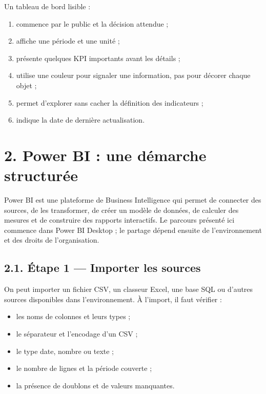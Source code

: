 \documentclass[
  french,
  letterpaper,
  open=any]{scrbook}
\providecommand{\tightlist}{%
  \setlength{\itemsep}{0pt}\setlength{\parskip}{0pt}}
\theoremstyle{definition}
\theoremstyle{definition}
\theoremstyle{remark}
\begin{document}
Un tableau de bord lisible :

\begin{enumerate}
\def\labelenumi{\arabic{enumi}.}
\tightlist
\item
  commence par le public et la décision attendue ;
\item
  affiche une période et une unité ;
\item
  présente quelques KPI importants avant les détails ;
\item
  utilise une couleur pour signaler une information, pas pour décorer
  chaque objet ;
\item
  permet d'explorer sans cacher la définition des indicateurs ;
\item
  indique la date de dernière actualisation.
\end{enumerate}

\section{2. Power BI : une démarche
structurée}\label{power-bi-une-duxe9marche-structuruxe9e}

Power BI est une plateforme de Business Intelligence qui permet de
connecter des sources, de les transformer, de créer un modèle de
données, de calculer des mesures et de construire des rapports
interactifs. Le parcours présenté ici commence dans Power BI Desktop ;
le partage dépend ensuite de l'environnement et des droits de
l'organisation.

\subsection{2.1. Étape 1 --- Importer les
sources}\label{uxe9tape-1-importer-les-sources}

On peut importer un fichier CSV, un classeur Excel, une base SQL ou
d'autres sources disponibles dans l'environnement. À l'import, il faut
vérifier :

\begin{itemize}
\tightlist
\item
  les noms de colonnes et leurs types ;
\item
  le séparateur et l'encodage d'un CSV ;
\item
  le type date, nombre ou texte ;
\item
  le nombre de lignes et la période couverte ;
\item
  la présence de doublons et de valeurs manquantes.
\end{itemize}
\end{document}
